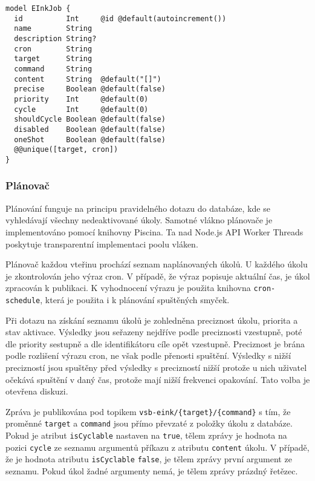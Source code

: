 \begin{lstlisting}[label=src:scheduler-schema,caption={Datové schéma třídy EInkJob}]
model EInkJob {
  id          Int     @id @default(autoincrement())
  name        String
  description String?
  cron        String
  target      String
  command     String
  content     String  @default("[]")
  precise     Boolean @default(false)
  priority    Int     @default(0)
  cycle       Int     @default(0)
  shouldCycle Boolean @default(false)
  disabled    Boolean @default(false)
  oneShot     Boolean @default(false)
  @@unique([target, cron])
}
\end{lstlisting}

\subsubsection{Plánovač}
Plánování funguje na principu pravidelného dotazu do databáze, kde se vyhledávají všechny nedeaktivované úkoly. Samotné vlákno plánovače je implementováno pomocí knihovny Piscina. Ta nad Node.js API Worker Threads poskytuje transparentní implementaci poolu vláken.

Plánovač každou vteřinu prochází seznam naplánovaných úkolů. U každého úkolu je zkontrolován jeho výraz cron. V případě, že výraz popisuje aktuální čas, je úkol zpracován k publikaci. K vyhodnocení výrazu je použita knihovna \lstinline{cron-schedule}, která je použita i k plánování spuštěných smyček. 

Při dotazu na získání seznamu úkolů je zohledněna preciznost úkolu, priorita a stav aktivace. Výsledky jsou seřazeny nejdříve podle preciznosti vzestupně, poté dle priority sestupně a dle identifikátoru cíle opět vzestupně. Preciznost je brána podle rozlišení výrazu cron, ne však podle přenosti spuštění. Výsledky s nižší precizností jsou spuštěny před výsledky s precizností nižší protože u nich uživatel očekává spuštění v daný čas, protože mají nižší frekvenci opakování. Tato volba je otevřena diskuzi.

Zpráva je publikována pod topikem \lstinline|vsb-eink/{target}/{command}| s tím, že proměnné \lstinline{target} a \lstinline{command} jsou přímo převzaté z položky úkolu z databáze. Pokud je atribut \lstinline{isCyclable} nastaven na \lstinline{true}, tělem zprávy je hodnota na pozici \lstinline{cycle} ze seznamu argumentů příkazu z atributu \lstinline{content} úkolu. V případě, že je hodnota atributu \lstinline{isCyclable} \lstinline{false}, je tělem zprávy první argument ze seznamu. Pokud úkol žadné argumenty nemá, je tělem zprávy prázdný řetězec.

